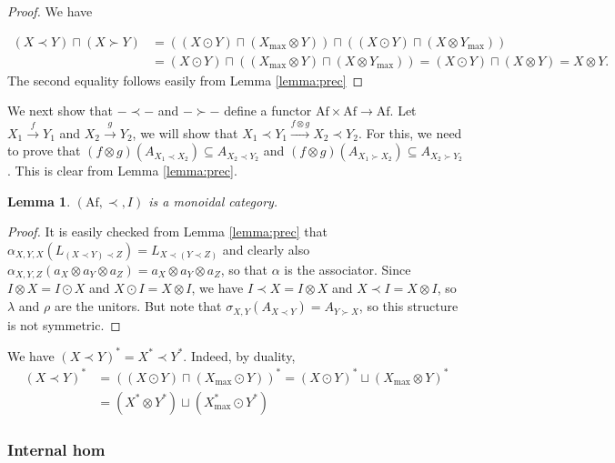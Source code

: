 \documentclass[12pt]{article}
\newtheorem{lemma}{Lemma}
\theoremstyle{definition}
\theoremstyle{remark}
\def \Af{\mathrm{Af}}
\begin{document}
\begin{proof} We have 

\begin{align*}
(X\prec Y) \sqcap (X\succ Y)&=((X\odot Y)\sqcap (X_{\max}\otimes Y))\sqcap ((X\odot
Y)\sqcap (X\otimes Y_{\max}))\\
&= (X\odot Y) \sqcap((X_{\max}\otimes Y)\sqcap (X\otimes Y_{\max}))=(X\odot Y)\sqcap
(X\otimes Y)=X\otimes Y.
\end{align*}
The second equality follows easily from Lemma \ref{lemma:prec}
\end{proof}

We next show that $-\prec -$ and $-\succ -$ define a functor $\Af\times \Af\to \Af$. Let
$X_1\xrightarrow{f} Y_1$ and $X_2\xrightarrow{g} Y_2$, we will show that 
$X_1\prec Y_1\xrightarrow{f\otimes g} X_2\prec Y_2$. For this, we need to prove that 
$(f\otimes g)(A_{X_1\prec X_2})\subseteq A_{X_2\prec Y_2}$ and $(f\otimes g)(A_{X_1\succ
X_2})\subseteq A_{X_2\succ Y_2}$. This is clear from Lemma \ref{lemma:prec}. 



\begin{lemma}\label{lemma:precmonoidal} $(\Af,\prec,I)$ is a monoidal category.  

\end{lemma}

\begin{proof} It is easily checked from Lemma \ref{lemma:prec} that
$\alpha_{X,Y,X}(L_{(X\prec Y)\prec Z})=L_{X\prec(Y\prec Z)}$ and clearly also
$\alpha_{X,Y,Z}(a_X\otimes a_Y\otimes a_Z)=a_X\otimes a_Y\otimes a_Z$, so that $\alpha$ is
the associator. Since $I\otimes X=I\odot X$ and $X\odot I=X\otimes I$, we have 
$I\prec X=I\otimes X$ and $X\prec I=X\otimes I$, so $\lambda$ and $\rho$ are the
unitors. But note that $\sigma_{X,Y}(A_{X\prec Y})=A_{Y\succ X}$, so this structure is
not symmetric. 

\end{proof}

We have $(X\prec Y)^*=X^*\prec Y^*$. Indeed, by duality,
\begin{align*}
(X\prec Y)^*&=((X\odot Y)\sqcap (X_{\max}\odot Y))^*=(X\odot Y)^*\sqcup (X_{\max}\otimes
Y)^*\\
&= (X^*\otimes Y^*)\sqcup (X_{\max}^*\odot Y^*)
\end{align*}




\subsubsection{Internal hom}
\end{document}
